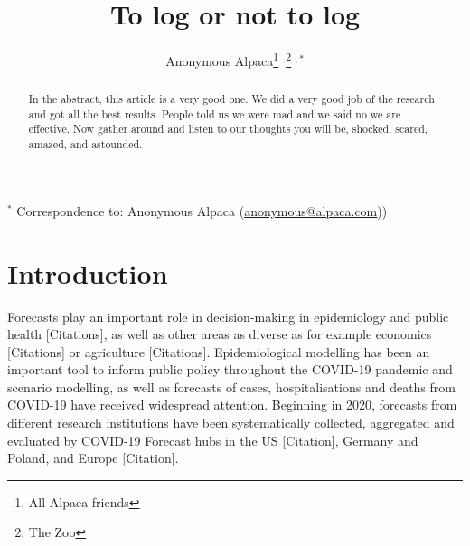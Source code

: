 \documentclass{article}
\begin{document}
\title{To log or not to log}
  \author{Anonymous Alpaca\thanks{All Alpaca friends} $^{,}$\thanks{The Zoo} $^{ , *}$}

\maketitle

\tableofcontents

\begin{abstract}
In the abstract, this article is a very good one. We did a very good job of the research and got all the best results. People told us we were mad and we said no we are effective. Now gather around and listen to our thoughts you will be, shocked, scared, amazed, and astounded.
\end{abstract}

\bigskip

{\footnotesize $^*$ Correspondence to: Anonymous Alpaca (\url{anonymous@alpaca.com}))}



\newpage


\section{Introduction}

Forecasts play an important role in decision-making in epidemiology and public health [Citations], as well as other areas as diverse as for example economics [Citations] or agriculture [Citations]. Epidemiological modelling has been an important tool to inform public policy throughout the COVID-19 pandemic and scenario modelling, as well as forecasts of cases, hospitalisations and deaths from COVID-19 have received widespread attention. Beginning in 2020, forecasts from different research institutions have been systematically collected, aggregated and evaluated by COVID-19 Forecast hubs in the US [Citation], Germany and Poland, and Europe [Citation]. 
\end{document}
